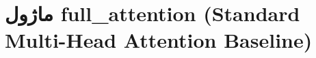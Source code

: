 \section{ماژول full\_attention (Standard Multi-Head Attention Baseline)}
\label{sec:module_full_attention}
